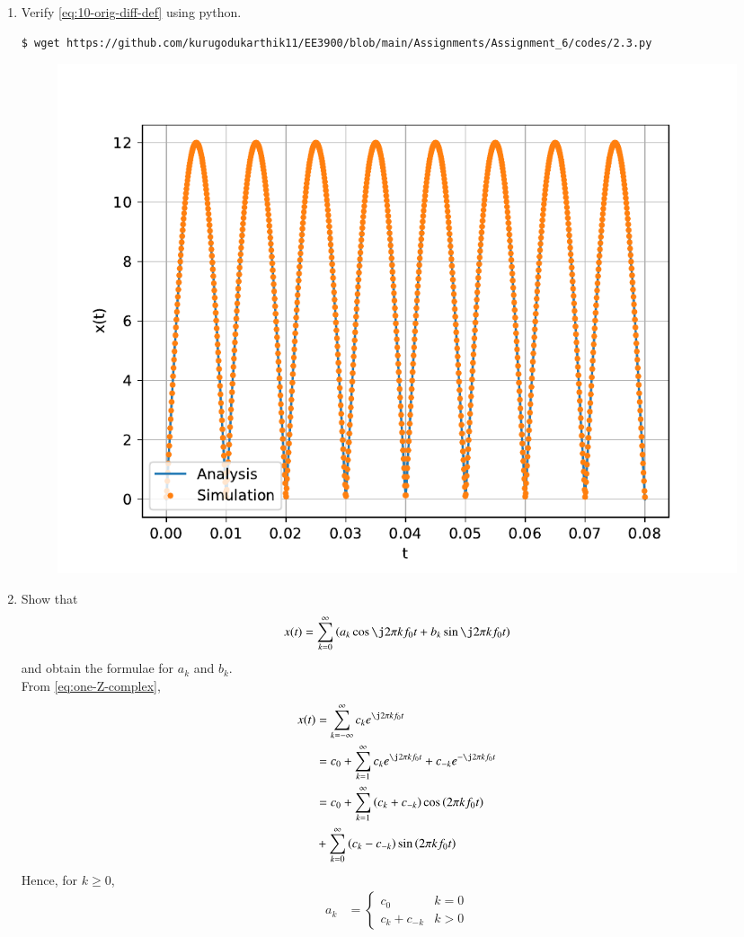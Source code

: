 \documentclass[journal,12pt,twocolumn]{IEEEtran}
\renewcommand\thesection{\arabic{section}}
\begin{document}
\begin{enumerate}[label=\thesection.\arabic*,ref=\thesection.\theenumi]
\item Verify
\eqref{eq:10-orig-diff-def}
using python. \\
\solution
\begin{lstlisting}
$ wget https://github.com/kurugodukarthik11/EE3900/blob/main/Assignments/Assignment_6/codes/2.3.py
\end{lstlisting}
\begin{figure}[!ht]
\includegraphics[width=\columnwidth]{figs/2.3.pdf}
\caption{}
\label{fig:ver-complex}
\end{figure}
\item Show that
\begin{align}
x(t) = \sum_{k = 0}^{\infty}\brak{a_k\cos{\j2\pi kf_0 t}+b_k\sin{\j2\pi kf_0 t}}
\label{eq:one-Z-real}
\end{align}
and obtain the formulae for $a_k$ and $b_k$. \\
\solution From \eqref{eq:one-Z-complex},
\begin{align}
x(t) &= \sum_{k = -\infty}^{\infty}c_ke^{\j2\pi kf_0 t} \\
&= c_0 + \sum_{k = 1}^{\infty}c_ke^{\j2\pi kf_0t} + c_{-k}e^{-\j2\pi kf_0t} \\
&= c_0 + \sum_{k = 1}^{\infty}\brak{c_k + c_{-k}}\cos\brak{2\pi kf_0t}  \nonumber \\
&+ \sum_{k = 0}^{\infty}\brak{c_k - c_{-k}}\sin\brak{2\pi kf_0t}
\end{align}
Hence, for $k \ge 0$,
\begin{align}
a_k &=
\begin{cases}
c_0 & k = 0 \\
c_k + c_{-k} & k > 0

\end{cases}
\end{align}
\end{enumerate}
\end{document}
